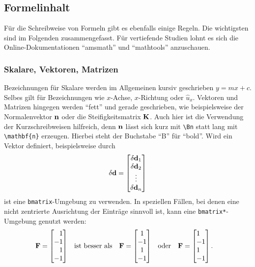 \subsection{Formelinhalt}

Für die Schreibweise von Formeln gibt es ebenfalls einige Regeln. Die
wichtigsten sind im Folgenden zusammengefasst. Für vertiefende Studien lohnt es
sich die Online-Dokumentationen "`amsmath"' und "`mathtools"' anzuschauen.

\subsubsection{Skalare, Vektoren, Matrizen}

Bezeichnungen für Skalare werden im Allgemeinen kursiv geschrieben $y=mx+c$.
Selbes gilt für Bezeichnungen wie $x$-Achse, $x$-Richtung oder $\hat{u}_x$.
%
Vektoren und Matrizen hingegen werden "`fett"' und gerade
geschrieben, wie beispielsweise der Normalenvektor ${\mathbf n}$ oder die
Steifigkeitsmatrix ${\mathbf K}$. Auch hier ist die Verwendung der Kurzschreibweisen
hilfreich, denn ${\mathbf n}$ lässt sich kurz mit \verb+\Bn+ statt lang mit
\verb+\mathbf{n}+ erzeugen. Hierbei steht der Buchstabe "`B"' für "`bold"'. Wird
ein Vektor definiert, beispielsweise durch
\begin{align}
{\delta}{\mathbf d} = \begin{bmatrix}
 {\delta}{\mathbf d}_1 \\
 {\delta}{\mathbf d}_2 \\
 \vdots \\
 {\delta}{\mathbf d}_{n}
\end{bmatrix}
\end{align}
ist eine \verb+bmatrix+-Umgebung zu verwenden. In speziellen Fällen, bei denen
eine nicht zentrierte Ausrichtung der Einträge sinnvoll ist, kann eine
\verb+bmatrix*+-Umgebung genutzt werden:
\begin{align}
\BF &= \begin{bmatrix*}[r]
 1 \\
 -1\\
 1 \\
 -1
\end{bmatrix*}
&& \text{ist besser als} &
\BF &= \begin{bmatrix}
 1 \\
 -1\\
 1 \\
 -1
\end{bmatrix}
&& \text{oder} &
\BF &= \begin{bmatrix*}[l]
 1 \\
 -1\\
 1 \\
 -1
\end{bmatrix*} .
\end{align}


